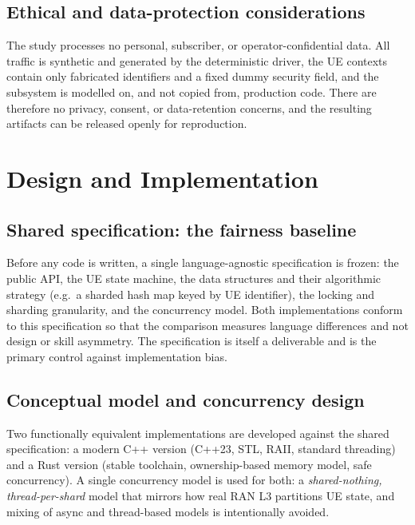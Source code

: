 \documentclass[english,twoside,openright,a4paper,censored,csm,software-track-2020]{HYthesisML}
\begin{document}
\section{Ethical and data-protection considerations}
The study processes no personal, subscriber, or operator-confidential data. All traffic is
synthetic and generated by the deterministic driver, the UE contexts contain only fabricated
identifiers and a fixed dummy security field, and the subsystem is modelled on, and not
copied from, production code. There are therefore no privacy, consent, or data-retention
concerns, and the resulting artifacts can be released openly for reproduction.

\chapter{Design and Implementation\label{chapter:design}}

\section{Shared specification: the fairness baseline}
\label{sec:fairness}
Before any code is written, a single language-agnostic specification is frozen: the public
API, the UE state machine, the data structures and their algorithmic strategy (e.g.\ a
sharded hash map keyed by UE identifier), the locking and sharding granularity, and the
concurrency model. Both implementations conform to this specification so that the comparison
measures language differences and not design or skill asymmetry. The specification is
itself a deliverable and is the primary control against implementation bias.

\section{Conceptual model and concurrency design}
Two functionally equivalent implementations are developed against the shared specification:
a modern C++ version (C++23, STL, RAII, standard threading) and a Rust version (stable
toolchain, ownership-based memory model, safe concurrency). A single concurrency model is
used for both: a \emph{shared-nothing, thread-per-shard} model that mirrors how real RAN L3
partitions UE state, and mixing of async and thread-based models is intentionally avoided.
\end{document}
